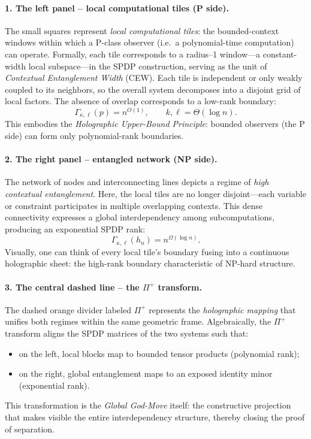 \documentclass[12pt]{article}
\theoremstyle{definition}
\theoremstyle{definition}
\theoremstyle{remark}
\theoremstyle{remark}
\begin{document}
\paragraph{1. The left panel -- local computational tiles (P side).}
The small squares represent \emph{local computational tiles}:
the bounded-context windows within which a P-class observer
(i.e.\ a polynomial-time computation) can operate.
Formally, each tile corresponds to a radius--1 window---a constant-width local
subspace---in the SPDP construction, serving as the unit of
\emph{Contextual Entanglement Width} (CEW).
Each tile is independent or only weakly coupled to its neighbors,
so the overall system decomposes into a disjoint grid of local factors.
The absence of overlap corresponds to a low-rank boundary:
\[
\Gamma_{\kappa,\ell}(p)=n^{O(1)}, \qquad k,\ell=\Theta(\log n).
\]
This embodies the \emph{Holographic Upper-Bound Principle}:
bounded observers (the P side) can form only polynomial-rank boundaries.

\paragraph{2. The right panel -- entangled network (NP side).}
The network of nodes and interconnecting lines depicts a regime of
\emph{high contextual entanglement}.
Here, the local tiles are no longer disjoint---each variable or constraint
participates in multiple overlapping contexts.
This dense connectivity expresses a global interdependency among subcomputations,
producing an exponential SPDP rank:
\[
\Gamma_{\kappa,\ell}(h_n)=n^{\Omega(\log n)}.
\]
Visually, one can think of every local tile's boundary fusing into a continuous
holographic sheet: the high-rank boundary characteristic of NP-hard structure.

\paragraph{3. The central dashed line -- the $\Pi^{+}$ transform.}
The dashed orange divider labeled $\Pi^{+}$ represents the
\emph{holographic mapping} that unifies both regimes within the same
geometric frame.
Algebraically, the $\Pi^{+}$ transform aligns the SPDP matrices of the
two systems such that:
\begin{itemize}
    \item on the left, local blocks map to bounded tensor products
          (polynomial rank);
    \item on the right, global entanglement maps to an exposed
          identity minor (exponential rank).
\end{itemize}
This transformation is the \emph{Global God-Move} itself:
the constructive projection that makes visible the entire interdependency structure,
thereby closing the proof of separation.
\end{document}
